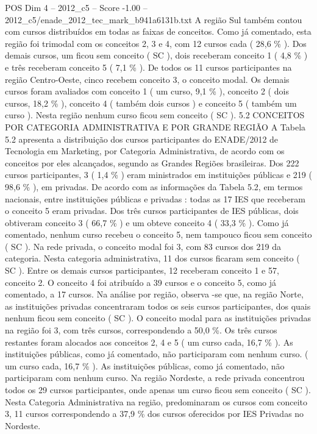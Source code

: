 \begin{textsample}{POS Dim 4 – 2012\_c5 – Score -1.00 – 2012\_c5/enade\_2012\_tec\_mark\_b941a6131b.txt}
A região Sul também contou com cursos distribuídos em todas as faixas de conceitos.
Como já comentado, esta região foi trimodal com os conceitos 2, 3 e 4, com 12 cursos cada ( 28,6 \% ).
Dos demais cursos, um ficou sem conceito ( SC ), dois receberam conceito 1 ( 4,8 \% ) e três receberam conceito 5 ( 7,1 \% ).
De todos os 11 cursos participantes na região Centro-Oeste, cinco recebem conceito 3, o conceito modal.
Os demais cursos foram avaliados com conceito 1 ( um curso, 9,1 \% ), conceito 2 ( dois cursos, 18,2 \% ), conceito 4 ( também dois cursos ) e conceito 5 ( também um curso ).
Nesta região nenhum curso ficou sem conceito ( SC ). 5.2 CONCEITOS POR CATEGORIA ADMINISTRATIVA E POR GRANDE REGIÃO A Tabela 5.2 apresenta a distribuição dos cursos participantes do ENADE/2012 de Tecnologia em Marketing, por Categoria Administrativa, de acordo com os conceitos por eles alcançados, segundo as Grandes Regiões brasileiras.
Dos 222 cursos participantes, 3 ( 1,4 \% ) eram ministrados em instituições públicas e 219 ( 98,6 \% ), em privadas.
De acordo com as informações da Tabela 5.2, em termos nacionais, entre instituições públicas e privadas : todas as 17 IES que receberam o conceito 5 eram privadas.
Dos três cursos participantes de IES públicas, dois obtiveram conceito 3 ( 66,7 \% ) e um obteve conceito 4 ( 33,3 \% ).
Como já comentado, nenhum curso recebeu o conceito 5, nem tampouco ficou sem conceito ( SC ).
Na rede privada, o conceito modal foi 3, com 83 cursos dos 219 da categoria.
Nesta categoria administrativa, 11 dos cursos ficaram sem conceito ( SC ).
Entre os demais cursos participantes, 12 receberam conceito 1 e 57, conceito 2.
O conceito 4 foi atribuído a 39 cursos e o conceito 5, como já comentado, a 17 cursos.
Na análise por região, observa -se que, na região Norte, as instituições privadas concentraram todos os seis cursos participantes, dos quais nenhum ficou sem conceito ( SC ).
O conceito modal para as instituições privadas na região foi 3, com três cursos, correspondendo a 50,0 \%.
Os três cursos restantes foram alocados aos conceitos 2, 4 e 5 ( um curso cada, 16,7 \% ).
As instituições públicas, como já comentado, não participaram com nenhum curso. ( um curso cada, 16,7 \% ).
As instituições públicas, como já comentado, não participaram com nenhum curso.
Na região Nordeste, a rede privada concentrou todos os 29 cursos participantes, onde apenas um curso ficou sem conceito ( SC ).
Nesta Categoria Administrativa na região, predominaram os cursos com conceito 3, 11 cursos correspondendo a 37,9 \% dos cursos oferecidos por IES Privadas no Nordeste.

\end{textsample}
